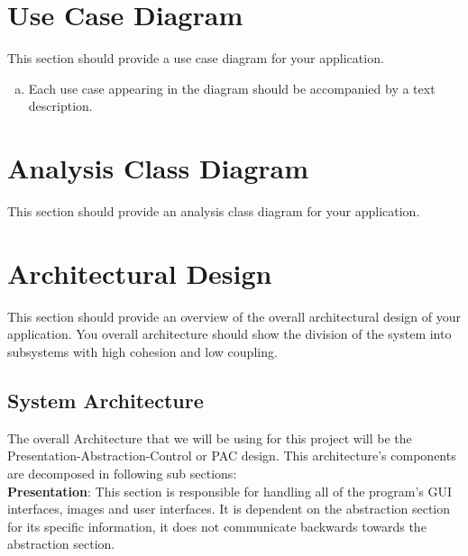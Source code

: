 \documentclass[]{article}
\begin{document}


\section{Use Case Diagram}
\label{sec:use_case_diagram}
This section should provide a use case diagram for your application. 
\begin{enumerate}[a)]
	\item Each use case appearing in the diagram should be accompanied by a text description. 
\end{enumerate}
\noindent{}


\section{Analysis Class Diagram}
\label{sec:analysis_class_diagram}
This section should provide an analysis class diagram for your application.


\section{Architectural Design}
\label{sec:architectural_design}
This section should provide an overview of the overall architectural design of
your application. You overall architecture should show the division of the system
into subsystems with high cohesion and low coupling.

\subsection{System Architecture}
\label{sub:system_architecture}

The overall Architecture that we will be using for this project will be the 
Presentation-Abstraction-Control or PAC design. This architecture’s components 
are decomposed in following sub sections: \\

\textbf{Presentation}: This section is responsible for handling all of the program’s
GUI interfaces, images and user interfaces. It is dependent on the abstraction section
for its specific information, it does not communicate backwards towards the abstraction section. \\
\end{document}
